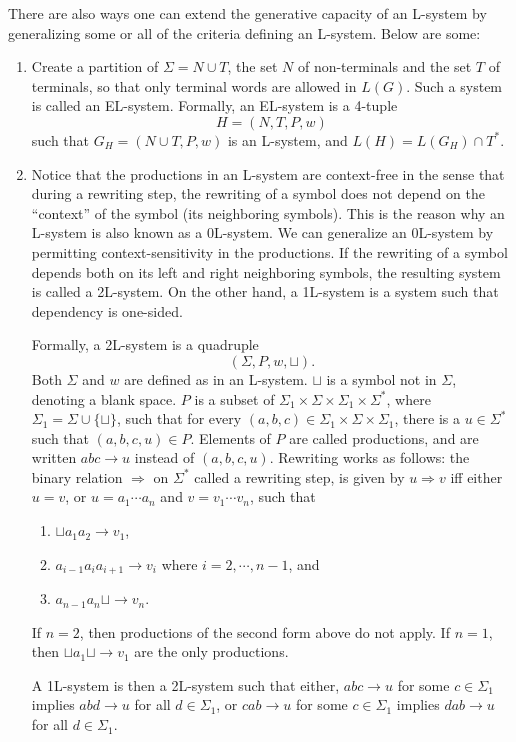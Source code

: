 \documentclass[12pt]{article}
\begin{document}
There are also ways one can extend the generative capacity of an L-system by generalizing some or all of the criteria defining an L-system.  Below are some:
\begin{enumerate}
\item Create a partition of $\Sigma=N\cup T$, the set $N$ of non-terminals and the set $T$ of terminals, so that only terminal words are allowed in $L(G)$.  Such a system is called an EL-system.  Formally, an EL-system is a 4-tuple $$H=(N,T,P,w)$$ such that $G_H=(N\cup T,P,w)$ is an L-system, and $L(H)=L(G_H)\cap T^*$.
\item Notice that the productions in an L-system are context-free in the sense that during a rewriting step, the rewriting of a symbol does not depend on the ``context'' of the symbol (its neighboring symbols).  This is the reason why an L-system is also known as a 0L-system.  We can generalize an 0L-system by permitting context-sensitivity in the productions.  If the rewriting of a symbol depends both on its left and right neighboring symbols, the resulting system is called a 2L-system.  On the other hand, a 1L-system is a system such that dependency is one-sided.  

Formally, a 2L-system is a quadruple $$(\Sigma, P, w,\sqcup).$$ Both $\Sigma$ and $w$ are defined as in an L-system.  $\sqcup$ is a symbol not in $\Sigma$, denoting a blank space.  $P$ is a subset of $\Sigma_1 \times \Sigma\times \Sigma_1 \times \Sigma^*$, where $\Sigma_1 = \Sigma \cup \lbrace \sqcup \rbrace$, such that for every $(a,b,c)\in \Sigma_1 \times \Sigma\times \Sigma_1$, there is a $u\in \Sigma^*$ such that $(a,b,c,u)\in P$.  Elements of $P$ are called productions, and are written $abc\to u$ instead of $(a,b,c,u)$.  Rewriting works as follows: the binary relation $\Rightarrow$ on $\Sigma^*$ called a rewriting step, is given by $u\Rightarrow v$ iff either $u=v$, or $u=a_1\cdots a_n$ and $v=v_1\cdots v_n$, such that 
\begin{enumerate}
\item $\sqcup a_1 a_2 \to v_1$,
\item $a_{i-1} a_i a_{i+1} \to v_i$ where $i=2,\cdots, n-1$, and
\item $a_{n-1}a_n\sqcup \to v_n$.  
\end{enumerate}
If $n=2$, then productions of the second form above do not apply.  If $n=1$, then $\sqcup a_1 \sqcup \to v_1$ are the only productions.

A 1L-system is then a 2L-system such that either, $abc \to u$ for some $c\in \Sigma_1$ implies $abd\to u$ for all $d\in \Sigma_1$, or $cab \to u$ for some $c\in \Sigma_1$ implies $dab \to u$ for all $d\in \Sigma_1$.


\end{enumerate}
\end{document}
